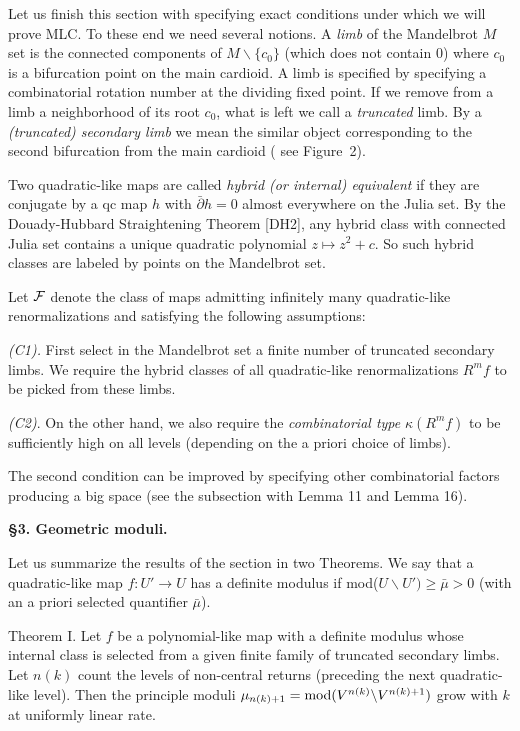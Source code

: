Let us finish this section with specifying exact conditions under which
we will prove MLC. To these end we need several notions. A {\sl limb} of
the Mandelbrot $M$ set is the connected components of $M\backslash \{c_0\}$
(which does not contain 0)
where $c_0$ is a bifurcation point on the main cardioid. A limb is specified by 
specifying a combinatorial rotation number at the dividing fixed point.
If we remove from a limb a neighborhood of its root $c_0$,
 what is left  we call a {\sl truncated} limb.
By a {\sl (truncated) secondary limb } we mean
the similar object corresponding to the second bifurcation
from the main cardioid ( see Figure~2). 

Two  quadratic-like maps are called {\sl hybrid (or internal) equivalent}
if they are conjugate by a qc map $h$ with $\bar\partial h=0$ almost
everywhere on the Julia set. By the Douady-Hubbard  Straightening Theorem
[DH2], any hybrid class with connected Julia set contains a unique
quadratic polynomial $z\mapsto z^2+c$. So such hybrid classes are labeled
by points on the Mandelbrot set. 

Let ${\cal F}$ denote the class of maps admitting 
infinitely many  quadratic-like renormalizations and
  satisfying the following assumptions:

{\sl (C1).} First select in the Mandelbrot set
a finite number
of truncated secondary limbs.
We require the hybrid classes of all quadratic-like renormalizations
 $R^m f$ to be picked from these limbs. 

{\sl (C2)}. On the other hand, we also require the 
{\sl combinatorial type} $\kappa(R^m f)$
to be sufficiently high on all levels (depending on the 
a priori choice of limbs).

\smallskip\noindent The second condition can be improved by specifying
other combinatorial factors producing a big space (see the subsection
with Lemma 11 and Lemma 16). 


\bigskip

\centerline{\bf \S 3. Geometric moduli.}\bigskip

Let us summarize the results of the section in two Theorems.
We say that a 
quadratic-like map $f: U'\rightarrow U$ has a definite modulus
if mod($U\backslash U')\geq\bar\mu>0$ (with an a priori selected quantifier 
$\bar\mu$).



\proclaim Theorem I. Let $f$ be a polynomial-like map with a definite modulus
whose internal class is selected from a given finite family of truncated
secondary limbs. Let $n(k)$ count the  levels  of non-central returns
(preceding the next quadratic-like level). Then the principle moduli 
$\mu_{n(k)+1}={\rm mod} (V^{n(k)}\backslash V^{n(k)+1})$
 grow with $k$ at uniformly linear rate. 

